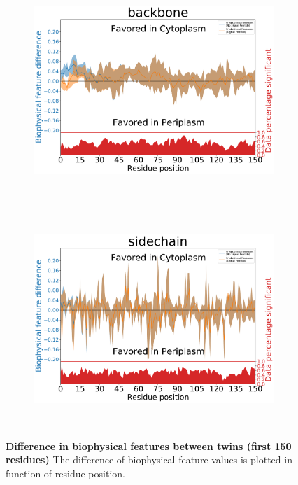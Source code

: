 ~\begin{figure}[h!]
	\ContinuedFloat
	~\begin{subfigure}[b]{\linewidth}
			\centering
			\includegraphics[width=\linewidth, height=0.34\textheight, keepaspectratio]
	{./results/twins/img/backbone.pdf}
		\caption{}
		\label{fig:twin_backbone}
	~\end{subfigure}
	\newline
	~\begin{subfigure}[b]{\linewidth}
			\centering
			\includegraphics[width=\linewidth, height=0.34\textheight, keepaspectratio]
	{./results/twins/img/sidechain.pdf}
		\caption{}
		\label{fig:twin_sidechain}
	~\end{subfigure}
	\caption{
	\textbf{Difference in biophysical features between twins (first 150 residues)}
The difference of biophysical feature values is plotted in function of residue position.
}
\end{figure}
